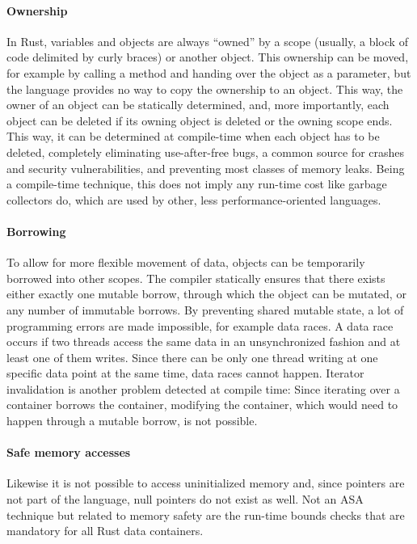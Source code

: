 \documentclass{scrartcl}
\begin{document}
\paragraph{Ownership} In Rust, variables and objects are always ``owned'' by a scope (usually, a block of code delimited by curly braces) or another object. This ownership can be moved, for example by calling a method and handing over the object as a parameter, but the language provides no way to copy the ownership to an object. This way, the owner of an object can be statically determined, and, more importantly, each object can be deleted if its owning object is deleted or the owning scope ends. This way, it can be determined at compile-time when each object has to be deleted, completely eliminating use-after-free bugs, a common source for crashes and security vulnerabilities, and preventing most classes of memory leaks. Being a compile-time technique, this does not imply any run-time cost like garbage collectors do, which are used by other, less performance-oriented languages.

\paragraph{Borrowing} To allow for more flexible movement of data, objects can be temporarily borrowed into other scopes. The compiler statically ensures that there exists either exactly one mutable borrow, through which the object can be mutated, or any number of immutable borrows. By preventing shared mutable state, a lot of programming errors are made impossible, for example data races. A data race occurs if two threads access the same data in an unsynchronized fashion and at least one of them writes. Since there can be only one thread writing at one specific data point at the same time, data races cannot happen. Iterator invalidation is another problem detected at compile time: Since iterating over a container borrows the container, modifying the container, which would need to happen through a mutable borrow, is not possible.

\paragraph{Safe memory accesses} Likewise it is not possible to access uninitialized memory and, since pointers are not part of the language, null pointers do not exist as well. Not an ASA technique but related to memory safety are the run-time bounds checks that are mandatory for all Rust data containers.
\end{document}
